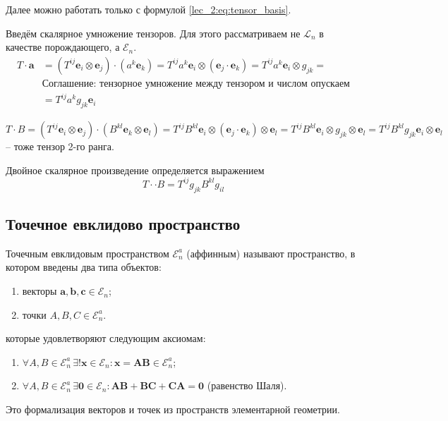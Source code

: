 Далее можно работать только с формулой \eqref{lec_2:eq:tensor_basis}.

Введём скалярное умножение тензоров. Для этого рассматриваем не $\mathcal{L}_n$ в качестве
порождающего, а $\mathcal{E}_n$.
\begin{align*}
  T \cdot \mathbf{a} &= (T^{ij} \mathbf{e}_i \otimes \mathbf{e}_j) \cdot (a^k \mathbf{e}_k)
  = T^{ij} a^k \mathbf{e}_i \otimes (\mathbf{e}_j \cdot \mathbf{e}_k)
  = T^{ij} a^k \mathbf{e}_i \otimes g_{jk} = \\
  &\text{Соглашение: тензорное умножение между тензором и числом опускаем} \\
  &= T^{ij} a^k g_{jk} \mathbf{e}_i
\end{align*}

\[
  T \cdot B = (T^{ij} \mathbf{e}_i \otimes \mathbf{e}_j) \cdot (B^{kl} \mathbf{e}_k \otimes \mathbf{e}_l)
  = T^{ij} B^{kl} \mathbf{e}_i \otimes (\mathbf{e}_j \cdot \mathbf{e}_k) \otimes \mathbf{e}_l
  = T^{ij} B^{kl} \mathbf{e}_i \otimes g_{jk} \otimes \mathbf{e}_l
  = T^{ij} B^{kl} g_{jk} \mathbf{e}_i \otimes \mathbf{e}_l
\]
-- тоже тензор 2-го ранга.

Двойное скалярное произведение определяется выражением
\[
  T \cdot \cdot B = T^{ij} g_{jk} B^{kl} g_{il}
\]

\subsection{Точечное евклидово пространство}

\begin{definition}
  Точечным евклидовым пространством $\mathcal{E}_n^a$ (аффинным) называют пространство, в котором
  введены два типа объектов:
  \begin{enumerate}
    \item векторы $\mathbf{a}, \mathbf{b}, \mathbf{c} \in \mathcal{E}_n$;
    \item точки $A, B, C \in \mathcal{E}_n^a$.
  \end{enumerate}
  которые удовлетворяют следующим аксиомам:
  \begin{enumerate}
    \item $\forall A, B \in \mathcal{E}_n^a \, \exists! \mathbf{x} \in \mathcal{E}_n : \mathbf{x} = \mathbf{AB} \in \mathcal{E}_n^a$;
    \item $\forall A, B \in \mathcal{E}_n^a \, \exists \mathbf{0} \in \mathcal{E}_n : \mathbf{AB} + \mathbf{BC} + \mathbf{CA} = \mathbf{0}$ (равенство Шаля).
  \end{enumerate}
  Это формализация векторов и точек из пространств элементарной геометрии.
\end{definition}

